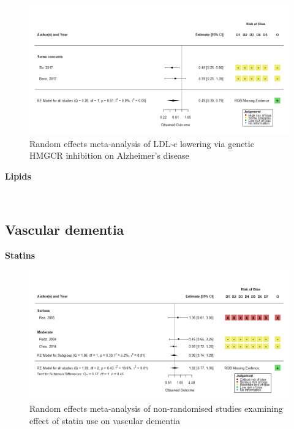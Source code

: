 \documentclass[a4paper, twoside]{templates/ociamthesis}
\begin{document}
\begin{figure}[H]
\includegraphics[width=1\linewidth]{figures/sys-rev/fp_MR_HMGCR_AD} \caption[Random effects meta-analysis of LDL-c lowering via genetic HMGCR inhibition on Alzheimer's disease]{Random effects meta-analysis of LDL-c lowering via genetic HMGCR inhibition on Alzheimer's disease}\label{fig:mrStatinDementiaFig}
\end{figure}

\textbf{Lipids}

~

\hypertarget{vascular-dementia}{%
\subsection{Vascular dementia}\label{vascular-dementia}}

\textbf{Statins}





\begin{figure}[H]
\includegraphics[width=1\linewidth]{figures/sys-rev/fp_obs_Statin-Ever_VaD} \caption[(ref:obsStatinDVaD-scap)]{Random effects meta-analysis of non-randomised studies examining effect of statin use on vascular dementia}\label{fig:obsStatinDVaDFig}
\end{figure}
\end{document}
